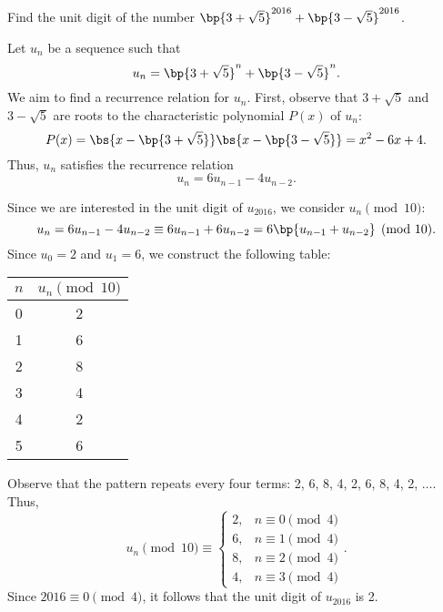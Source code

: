 \clearpage
\begin{problem}[\chili]
    Find the unit digit of the number $\bp{3 + \sqrt5}^{2016} + \bp{3 - \sqrt5}^{2016}$.
\end{problem}
\begin{solution}
    Let $u_n$ be a sequence such that \[u_n = \bp{3 + \sqrt5}^n + \bp{3 - \sqrt5}^n.\] We aim to find a recurrence relation for $u_n$. First, observe that $3 + \sqrt5$ and $3 - \sqrt5$ are roots to the characteristic polynomial $P(x)$ of $u_n$: \[P(x) = \bs{x - \bp{3 + \sqrt5}}\bs{x - \bp{3 - \sqrt5}} = x^2 - 6x + 4.\] Thus, $u_n$ satisfies the recurrence relation \[u_n = 6u_{n-1} - 4u_{n-2}.\]

    Since we are interested in the unit digit of $u_{2016}$, we consider $u_n \pmod{10}$: \[u_n = 6u_{n-1} - 4u_{n-2} \equiv 6u_{n-1} + 6u_{n-2} = 6\bp{u_{n-1} + u_{n-2}} \pmod{10}.\] Since $u_0 = 2$ and $u_1 = 6$, we construct the following table:

    \begin{table}[H]
        \centering
        \begin{tabular}{|c|c|}
        \hline
        $n$ & $u_n \pmod{10}$ \\ \hline\hline
        0 & 2 \\ \hline
        1 & 6 \\ \hline
        2 & 8 \\ \hline
        3 & 4 \\ \hline
        4 & 2 \\ \hline
        5 & 6 \\ \hline
        \end{tabular}
    \end{table}

    Observe that the pattern repeats every four terms: 2, 6, 8, 4, 2, 6, 8, 4, 2, $\dots$. Thus, \[u_n \pmod{10} \equiv \begin{cases}
        2, & n \equiv 0 \pmod{4} \\
        6, & n \equiv 1 \pmod{4} \\
        8, & n \equiv 2 \pmod{4} \\
        4, & n \equiv 3 \pmod{4}
    \end{cases}.\] Since $2016 \equiv 0 \pmod{4}$, it follows that the unit digit of $u_{2016}$ is 2.
\end{solution}

